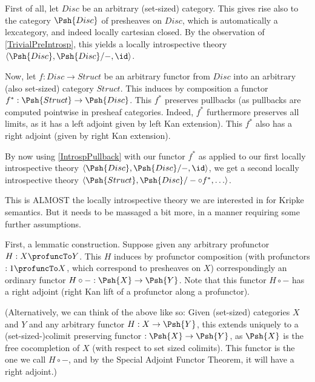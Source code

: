 First of all, let $Disc$ be an arbitrary (set-sized) category. This gives rise also to the category $\Psh{Disc}$ of presheaves on $Disc$, which is automatically a lexcategory, and indeed locally cartesian closed. By the observation of \cref{TrivialPreIntrosp}, this yields a locally introspective theory $\langle \Psh{Disc}, \Psh{Disc}/-, \id \rangle$.

Now, let $f : Disc \to Struct$ be an arbitrary functor from $Disc$ into an arbitrary (also set-sized) category $Struct$. This induces by composition a functor $f^* : \Psh{Struct} \to \Psh{Disc}$. This $f^*$ preserves pullbacks (as pullbacks are computed pointwise in presheaf categories. Indeed, $f^*$ furthermore preserves all limits, as it has a left adjoint given by left Kan extension). This $f^*$ also has a right adjoint (given by right Kan extension).


By now using \cref{IntrospPullback} with our functor $f^*$ as applied to our first locally introspective theory $\langle \Psh{Disc}, \Psh{Disc}/-, \id \rangle$, we get a second locally introspective theory $\langle \Psh{Struct}, \Psh{Disc}/- \circ f^*, \ldots \rangle$.

This is ALMOST the locally introspective theory we are interested in for Kripke semantics. But it needs to be massaged a bit more, in a manner requiring some further assumptions. 

First, a lemmatic construction. Suppose given any arbitrary profunctor $H : X \profuncTo Y$. This $H$ induces by profunctor composition (with profunctors $:1 \profuncTo X$, which correspond to presheaves on $X$) correspondingly an ordinary functor $H \circ - : \Psh{X} \to \Psh{Y}$. Note that this functor $H \circ -$ has a right adjoint (right Kan lift of a profunctor along a profunctor).

(Alternatively, we can think of the above like so: Given (set-sized) categories $X$ and $Y$ and any arbitrary functor $H : X \to \Psh{Y}$, this extends uniquely to a (set-sized-)colimit preserving functor $: \Psh{X} \to \Psh{Y}$, as $\Psh{X}$ is the free cocompletion of $X$ (with respect to set sized colimits). This functor is the one we call $H \circ -$, and by the Special Adjoint Functor Theorem, it will have a right adjoint.)

